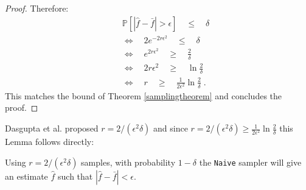 \begin{proof}
Therefore:
\begin{align*}
\quad&\mathds{P}[|\hat{f}-\bar{f} | > \epsilon] \quad\leq\quad \delta\\
&\Leftrightarrow\quad2e^{-2r\epsilon^2} \quad\leq\quad \delta\\
&\Leftrightarrow\quad e^{2r\epsilon^2} \quad\geq\quad \frac{2}{\delta}\\
&\Leftrightarrow\quad 2r\epsilon^2 \quad\geq\quad \ln\frac{2}{\delta}\\
&\Leftrightarrow\quad r \quad\geq\quad \frac{1}{2\epsilon^2}\ln{\frac{2}{\delta}} \;.
\end{align*}
This matches the bound of Theorem \ref{samplingtheorem} and concludes the proof.
\end{proof}
Dasgupta et al. \cite{dasgupta2012social} proposed $r=2/(\epsilon^2\delta)$ and since $r=2/(\epsilon^2\delta) \geq \frac{1}{2\epsilon^2}\ln{\frac{2}{\delta}}$ this Lemma follows directly:
\begin{lemma}
Using $r=2/(\epsilon^2\delta)$ samples, with probability $1-\delta$ the \texttt{Naive} sampler will give an estimate $\hat{f}$ such that $|\hat{f}-\bar{f}|< \epsilon$.
\end{lemma}

